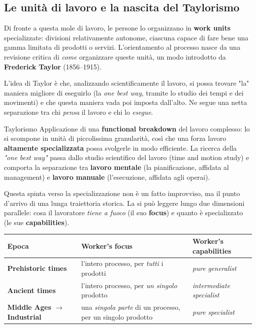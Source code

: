 \subsection{\texorpdfstring{Le unità di lavoro e la nascita del Taylorismo}{Le unità di lavoro e la nascita del Taylorismo}}

Di fronte a questa mole di lavoro, le persone lo organizzano in \textbf{work units} specializzate: divisioni relativamente autonome, ciascuna capace di fare bene una gamma limitata di prodotti o servizi. L'orientamento al processo nasce da una revisione critica di \emph{come} organizzare queste unità, un modo introdotto da \textbf{Frederick Taylor} (1856–1915).

L'idea di Taylor è che, analizzando scientificamente il lavoro, si possa trovare "la" maniera migliore di eseguirlo (la \emph{one best way}, tramite lo studio dei tempi e dei movimenti) e che questa maniera vada poi imposta dall'alto. Ne segue una netta separazione tra chi \emph{pensa} il lavoro e chi lo \emph{esegue}.

\begin{boxdefinition}{Taylorismo}
Applicazione di una \textbf{functional breakdown} del lavoro complesso: lo si scompone in unità di piccolissima granularità, così che una forza lavoro \textbf{altamente specializzata} possa svolgerle in modo efficiente. La ricerca della \emph{"one best way"} passa dallo studio scientifico del lavoro (time and motion study) e comporta la separazione tra \textbf{lavoro mentale} (la pianificazione, affidata al management) e \textbf{lavoro manuale} (l'esecuzione, affidata agli operai).
\end{boxdefinition}

Questa spinta verso la specializzazione non è un fatto improvviso, ma il punto d'arrivo di una lunga traiettoria storica. La si può leggere lungo due dimensioni parallele: cosa il lavoratore \emph{tiene a fuoco} (il suo \textbf{focus}) e quanto è specializzato (le sue \textbf{capabilities}).

\begingroup\small
\begin{tabularx}{\linewidth}{>{\raggedright\arraybackslash}X>{\raggedright\arraybackslash}X>{\raggedright\arraybackslash}X}
\toprule
\textbf{Epoca} & \textbf{Worker's focus} & \textbf{Worker's capabilities} \\
\midrule
\textbf{Prehistoric times} & l'intero processo, per \emph{tutti} i prodotti & \emph{pure generalist} \\
\textbf{Ancient times} & l'intero processo, per \emph{un singolo} prodotto & \emph{intermediate specialist} \\
\textbf{Middle Ages $\rightarrow$ Industrial} & una \emph{singola parte} di un processo, per un singolo prodotto & \emph{pure specialist} \\
\bottomrule
\end{tabularx}
\endgroup

